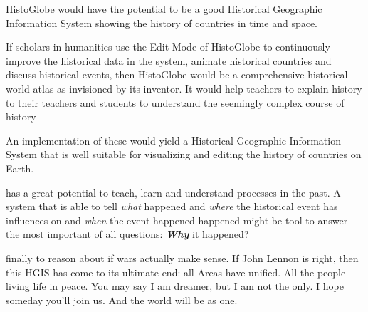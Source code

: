HistoGlobe would have the potential to be a good Historical Geographic Information System showing the history of countries in time and space.

If scholars in humanities use the Edit Mode of HistoGlobe to continuously improve the historical data in the system, animate historical countries and discuss historical events, then HistoGlobe would be a comprehensive historical world atlas as invisioned by its inventor. It would help teachers to explain  history to their teachers and students to understand the seemingly complex course of history

An implementation of these would yield a Historical Geographic Information System that is well suitable for visualizing and editing the history of countries on Earth.


has a great potential to teach, learn and understand processes in the past. A system that is able to tell \emph{what} happened and \emph{where} the historical event has influences on and \emph{when} the event happened happened might be tool to answer the most important of all questions:
\textbf{\emph{Why}} it happened?


finally to reason about if wars actually make sense.
If John Lennon is right, then this HGIS has come to its ultimate end: all Areas have unified. All the people living life in peace. You may say I am dreamer, but I am not the only. I hope someday you'll join us. And the world will be as one.



